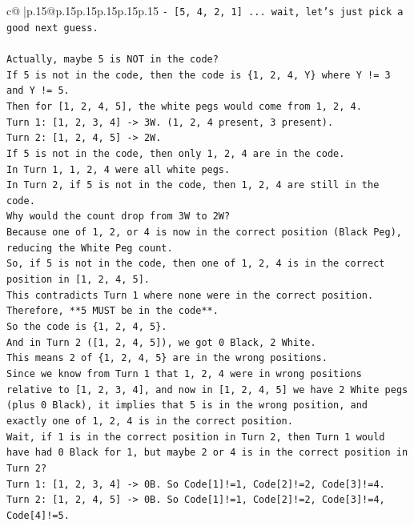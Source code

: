 \documentclass{article}
\begin{document}
{\begin{supertabular}{c@{$\;$}|p{.15\linewidth}@{}p{.15\linewidth}p{.15\linewidth}p{.15\linewidth}p{.15\linewidth}p{.15\linewidth}}
{{{\texttt{{-} {[}5, 4, 2, 1{]} ... wait, let's just pick a good next guess.} \\
\\ 
\texttt{Actually, maybe 5 is NOT in the code?} \\
\texttt{If 5 is not in the code, then the code is \{1, 2, 4, Y\} where Y != 3 and Y != 5.} \\
\texttt{Then for {[}1, 2, 4, 5{]}, the white pegs would come from 1, 2, 4.} \\
\texttt{Turn 1: {[}1, 2, 3, 4{]} {-}> 3W. (1, 2, 4 present, 3 present).} \\
\texttt{Turn 2: {[}1, 2, 4, 5{]} {-}> 2W.} \\
\texttt{If 5 is not in the code, then only 1, 2, 4 are in the code.} \\
\texttt{In Turn 1, 1, 2, 4 were all white pegs.} \\
\texttt{In Turn 2, if 5 is not in the code, then 1, 2, 4 are still in the code.} \\
\texttt{Why would the count drop from 3W to 2W?} \\
\texttt{Because one of 1, 2, or 4 is now in the correct position (Black Peg), reducing the White Peg count.} \\
\texttt{So, if 5 is not in the code, then one of 1, 2, 4 is in the correct position in {[}1, 2, 4, 5{]}.} \\
\texttt{This contradicts Turn 1 where none were in the correct position.} \\
\texttt{Therefore, **5 MUST be in the code**.} \\
\texttt{So the code is \{1, 2, 4, 5\}.} \\
\texttt{And in Turn 2 ({[}1, 2, 4, 5{]}), we got 0 Black, 2 White.} \\
\texttt{This means 2 of \{1, 2, 4, 5\} are in the wrong positions.} \\
\texttt{Since we know from Turn 1 that 1, 2, 4 were in wrong positions relative to {[}1, 2, 3, 4{]}, and now in {[}1, 2, 4, 5{]} we have 2 White pegs (plus 0 Black), it implies that 5 is in the wrong position, and exactly one of 1, 2, 4 is in the correct position.} \\
\texttt{Wait, if 1 is in the correct position in Turn 2, then Turn 1 would have had 0 Black for 1, but maybe 2 or 4 is in the correct position in Turn 2?} \\
\texttt{Turn 1: {[}1, 2, 3, 4{]} {-}> 0B. So Code{[}1{]}!=1, Code{[}2{]}!=2, Code{[}3{]}!=4.} \\
\texttt{Turn 2: {[}1, 2, 4, 5{]} {-}> 0B. So Code{[}1{]}!=1, Code{[}2{]}!=2, Code{[}3{]}!=4, Code{[}4{]}!=5.} \\
}}}
\end{supertabular}}
\end{document}

